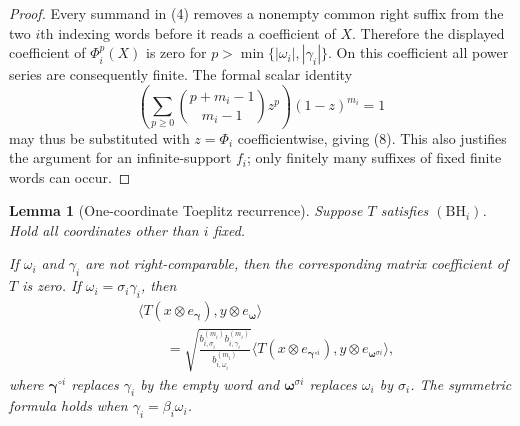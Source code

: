 \documentclass[11pt]{article}
\newtheorem{lemma}{Lemma}
\begin{document}
\begin{proof}
Every summand in (4) removes a nonempty common right suffix from the two $i$th indexing words before it reads a coefficient of $X$.  Therefore the displayed coefficient of $\Phi_i^p(X)$ is zero for $p>\min\{|\omega_i|,|\gamma_i|\}$.  On this coefficient all power series are consequently finite.  The formal scalar identity
\[
 \left(\sum_{p\geq0}\binom{p+m_i-1}{m_i-1}z^p\right)(1-z)^{m_i}=1
\]
may thus be substituted with $z=\Phi_i$ coefficientwise, giving (8).  This also justifies the argument for an infinite-support $f_i$; only finitely many suffixes of fixed finite words can occur.
\end{proof}

\begin{lemma}[One-coordinate Toeplitz recurrence]\label{lem:recurrence}
Suppose $T$ satisfies $(\mathrm{BH}_i)$.  Hold all coordinates other than $i$ fixed.

If $\omega_i$ and $\gamma_i$ are not right-comparable, then the corresponding matrix coefficient of $T$ is zero.  If $\omega_i=\sigma_i\gamma_i$, then
\begin{equation}
\tag{9}
\begin{split}
&\langle T(x\otimes e_{\boldsymbol\gamma}),y\otimes e_{\boldsymbol\omega}\rangle\\
&\qquad=\sqrt{\frac{b_{i,\sigma_i}^{(m_i)}b_{i,\gamma_i}^{(m_i)}}
                         {b_{i,\omega_i}^{(m_i)}}}
\langle T(x\otimes e_{\boldsymbol\gamma^{\circ i}}),
            y\otimes e_{\boldsymbol\omega^{\sigma i}}\rangle,
\end{split}
\end{equation}
where $\boldsymbol\gamma^{\circ i}$ replaces $\gamma_i$ by the empty word and $\boldsymbol\omega^{\sigma i}$ replaces $\omega_i$ by $\sigma_i$.  The symmetric formula holds when $\gamma_i=\beta_i\omega_i$.
\end{lemma}
\end{document}
